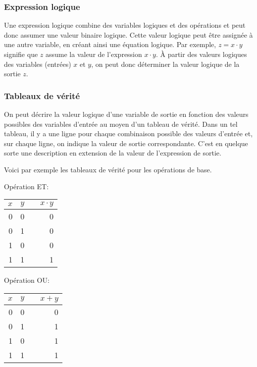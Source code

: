 \documentclass[11pt]{article}
\begin{document}
\subsubsection{Expression logique}
\label{sec:org99c172b}

Une expression logique combine des variables logiques et des
opérations et peut donc assumer une valeur binaire logique. Cette
valeur logique peut être assignée à une autre variable, en créant
ainsi une équation logique. Par exemple, \(z = x \cdot y\) signifie
que \(z\) assume la valeur de l'expression \(x \cdot y\). À partir des
valeurs logiques des variables (entrées) \(x\) et \(y\), on peut donc
déterminer la valeur logique de la sortie \(z\).

\subsubsection{Tableaux de vérité}
\label{sec:orgccbfc19}

On peut décrire la valeur logique d'une variable de sortie en
fonction des valeurs possibles des variables d'entrée au moyen
d'un tableau de vérité. Dans un tel tableau, il y a une ligne pour
chaque combinaison possible des valeurs d'entrée et, sur chaque ligne,
on indique la valeur de sortie correspondante. C'est en quelque sorte
une description en extension de la valeur de l'expression de sortie.

Voici par exemple les tableaux de vérité pour les opérations de base.

Opération ET:

\begin{center}
\begin{tabular}{rrlr}
\(x\) & \(y\) &  & \(x \cdot y\)\\[0pt]
\hline
0 & 0 &  & 0\\[0pt]
0 & 1 &  & 0\\[0pt]
1 & 0 &  & 0\\[0pt]
1 & 1 &  & 1\\[0pt]
\end{tabular}
\end{center}

Opération OU:

\begin{center}
\begin{tabular}{rrlr}
\(x\) & \(y\) &  & \(x + y\)\\[0pt]
\hline
0 & 0 &  & 0\\[0pt]
0 & 1 &  & 1\\[0pt]
1 & 0 &  & 1\\[0pt]
1 & 1 &  & 1\\[0pt]
\end{tabular}
\end{center}
\end{document}
